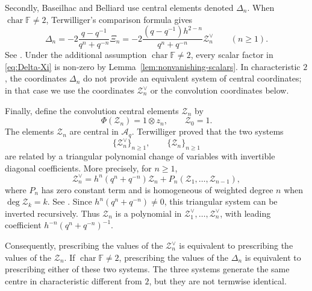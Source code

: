 \documentclass[11pt]{extarticle}
\theoremstyle{definition}
\theoremstyle{remark}
\numberwithin{equation}{section}
\newcommand{\F}{\mathbb F}
\newcommand{\Aq}{\mathcal A_q}
\newcommand{\XiC}{\Xi}
\newcommand{\Zvee}{\mathcal Z^{\vee}}
\newcommand{\Zconv}{\mathcal Z}
\begin{document}
Secondly, Baseilhac and Belliard use central elements denoted
\(\Delta_n\).  When \(\operatorname{char}\F\neq2\), Terwilliger's comparison
formula gives
\begin{equation}
\label{eq:Delta-Xi}
 \Delta_n
 =
 -2\frac{q-q^{-1}}{q^n+q^{-n}}\XiC_n
 =
 -2\frac{(q-q^{-1})h^{2-n}}{q^n+q^{-n}}\Zvee_n
 \qquad(n\geq1).
\end{equation}
See \cite[Remark~8.17]{Terwilliger2021ACE}.  Under the additional
assumption \(\operatorname{char}\F\neq2\), every scalar factor in
\eqref{eq:Delta-Xi} is non-zero by
Lemma~\ref{lem:nonvanishing-scalars}.  In characteristic \(2\), the
coordinates \(\Delta_n\) do not provide an equivalent system of central
coordinates; in that case we use the coordinates \(\Zvee_n\) or the
convolution coordinates below.

Finally, define the convolution central elements \(\Zconv_n\) by
\begin{equation}
\label{eq:convolution-central-coordinate}
        \Phi(\Zconv_n)=1\otimes z_n,
        \qquad
        \Zconv_0=1 .
\end{equation}
The elements \(\Zconv_n\) are central in \(\Aq\).  Terwilliger proved that
the two systems
\[
        \{\Zvee_n\}_{n\geq1},
        \qquad
        \{\Zconv_n\}_{n\geq1}
\]
are related by a triangular polynomial change of variables with
invertible diagonal coefficients.  More precisely, for \(n\geq1\),
\begin{equation}
\label{eq:Zvee-Zconv-triangular}
 \Zvee_n
 =
 h^n(q^n+q^{-n})\Zconv_n
 +P_n(\Zconv_1,\ldots,\Zconv_{n-1}),
\end{equation}
where \(P_n\) has zero constant term and is homogeneous of weighted degree
\(n\) when \(\deg\Zconv_k=k\).  See
\cite[Lemma~13.10(i)]{Terwilliger2022OqACE}.  Since
\(h^n(q^n+q^{-n})\neq0\), this triangular system can be inverted
recursively.  Thus \(\Zconv_n\) is a polynomial in
\(\Zvee_1,\ldots,\Zvee_n\), with leading coefficient
\(h^{-n}(q^n+q^{-n})^{-1}\).

Consequently, prescribing the values of the \(\Zvee_n\) is equivalent to
prescribing the values of the \(\Zconv_n\).  If
\(\operatorname{char}\F\neq2\), prescribing the values of the
\(\Delta_n\) is equivalent to prescribing either of these two systems.  The
three systems generate the same centre in characteristic different from
\(2\), but they are not termwise identical.
\end{document}

